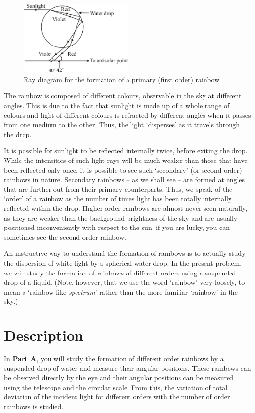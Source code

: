 \begin{figure}[!htb]
    \centering
    \includegraphics[width=0.5\textwidth]{figs/img1.jpg}
    \caption{Ray diagram for the formation of a primary (first order) rainbow}
    \label{fig:firstorder}
\end{figure}

The rainbow is composed of different colours, observable in the sky at different angles. This is due to the fact that sunlight is made up of a whole range of colours and light of different colours is refracted by different angles when it passes from one medium to the other. Thus, the light `disperses' as it travels through the drop.

It is possible for sunlight to be reflected internally twice, before exiting the drop. While the intensities of such light rays will be much weaker than those that have been reflected only once, it is possible to see such `secondary' (or second order) rainbows in nature. Secondary rainbows -- as we shall see -- are formed at angles that are further out from their primary counterparts. Thus, we speak of the `order' of a rainbow as the number of times light has been totally internally reflected within the drop. Higher order rainbows are almost never seen naturally, as they are weaker than the background brightness of the sky and are usually positioned inconveniently with respect to the sun; if you are lucky, you can sometimes see the second-order rainbow. 

An instructive way to understand the formation of rainbows is to actually study the dispersion of white light by a spherical water drop. In the present problem, we will study the formation of rainbows of different orders using a suspended drop of a liquid. (Note, however, that we use the word `rainbow' very loosely, to mean a `rainbow like \textit{spectrum}' rather than the more familiar `rainbow' in the sky.) 



\section*{Description}
In \textbf{Part A}, you will study the formation of different order rainbows by a suspended drop of water and measure their angular positions. These rainbows can be observed directly by the eye and their angular positions can be measured using the telescope and the circular scale. From this, the variation of total deviation of the incident light for different orders with the number of order rainbows is studied.

